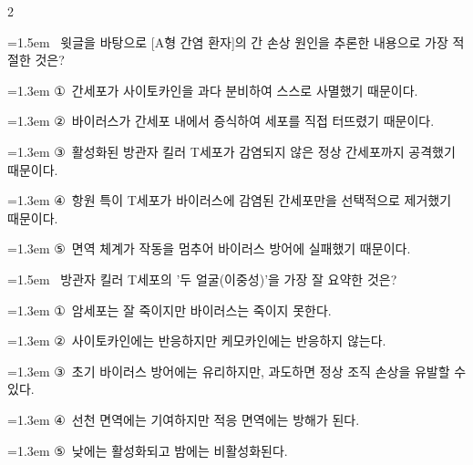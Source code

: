 \documentclass[10pt, a4paper]{article}
\begin{document}
\begin{multicols}{2}
\noindent\begin{minipage}{\columnwidth}
\vspace{2mm}
{\hangindent=1.5em  ~윗글을 바탕으로 [A형 간염 환자]의 간 손상 원인을 추론한 내용으로 가장 적절한 것은?\par}

\vspace{0.5mm}
{\hangindent=1.3em  \noindent\hspace{0.3em}①~간세포가 사이토카인을 과다 분비하여 스스로 사멸했기 때문이다.\par}
{\hangindent=1.3em  \noindent\hspace{0.3em}②~바이러스가 간세포 내에서 증식하여 세포를 직접 터뜨렸기 때문이다.\par}
{\hangindent=1.3em  \noindent\hspace{0.3em}③~활성화된 방관자 킬러 T세포가 감염되지 않은 정상 간세포까지 공격했기 때문이다.\par}
{\hangindent=1.3em  \noindent\hspace{0.3em}④~항원 특이 T세포가 바이러스에 감염된 간세포만을 선택적으로 제거했기 때문이다.\par}
{\hangindent=1.3em  \noindent\hspace{0.3em}⑤~면역 체계가 작동을 멈추어 바이러스 방어에 실패했기 때문이다.\par}
\vspace{4mm}
\end{minipage}
\par

\noindent\begin{minipage}{\columnwidth}
\vspace{2mm}
{\hangindent=1.5em  ~방관자 킬러 T세포의 '두 얼굴(이중성)'을 가장 잘 요약한 것은?\par}

\vspace{0.5mm}
{\hangindent=1.3em  \noindent\hspace{0.3em}①~암세포는 잘 죽이지만 바이러스는 죽이지 못한다.\par}
{\hangindent=1.3em  \noindent\hspace{0.3em}②~사이토카인에는 반응하지만 케모카인에는 반응하지 않는다.\par}
{\hangindent=1.3em  \noindent\hspace{0.3em}③~초기 바이러스 방어에는 유리하지만, 과도하면 정상 조직 손상을 유발할 수 있다.\par}
{\hangindent=1.3em  \noindent\hspace{0.3em}④~선천 면역에는 기여하지만 적응 면역에는 방해가 된다.\par}
{\hangindent=1.3em  \noindent\hspace{0.3em}⑤~낮에는 활성화되고 밤에는 비활성화된다.\par}
\vspace{4mm}
\end{minipage}
\par


\end{multicols}
\end{document}
